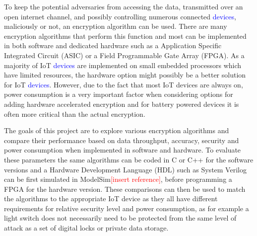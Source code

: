 \documentclass[12pt,twoside,a4paper]{report}
\begin{document}
    To keep the potential adversaries from accessing the data, transmitted over an open internet channel, and possibly controlling numerous connected \textcolor{blue}{devices}, maliciously or not, an encryption algorithm can be used.
    There are many encryption algorithms that perform this function and most can be implemented in both software and dedicated hardware such as a Application Specific Integrated Circuit (ASIC) or a Field Programmable Gate Array (FPGA).
    As a majority of IoT \textcolor{blue}{devices} are implemented on small embedded processors which have limited resources, the hardware option might possibly be a better solution for IoT \textcolor{blue}{devices}. 
    However, due to the fact that most IoT devices are always on, power consumption is a very important factor when considering options for adding hardware accelerated encryption and for battery powered devices it is often more critical than the actual encryption.
    
    The goals of this project are to explore various encryption algorithms and compare their performance based on data throughput, accuracy, security and power consumption when implemented in software and hardware.
    To evaluate these parameters the same algorithms can be coded in C or C++ for the software versions and a Hardware Development Language (HDL) such as System Verilog can be first simulated in ModelSim\textcolor{red}{[insert reference]}, before programming a FPGA for the hardware version.
    These comparisons can then be used to match the algorithms to the appropriate IoT device as they all have different requirements for relative security level and power consumption, as for example a light switch does not necessarily need to be protected from the same level of attack as a set of digital locks or private data storage.
    
    
\end{document}
